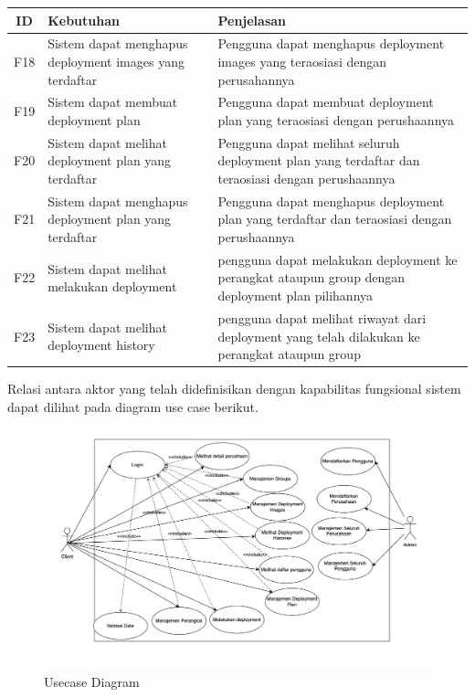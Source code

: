 \begin{table}
  \centering
  \begin{tabular}{|c|p{4.5cm}|p{8cm}|}
    \hline
    ID  & Kebutuhan                                               & Penjelasan                                                                                       \\
    \hline
    F18 & Sistem dapat menghapus deployment images yang terdaftar & Pengguna dapat menghapus deployment images yang teraosiasi dengan perusahannya                   \\
    \hline
    F19 & Sistem dapat membuat deployment plan                    & Pengguna dapat membuat deployment plan yang teraosiasi dengan perushaannya                       \\
    \hline
    F20 & Sistem dapat melihat deployment plan yang terdaftar     & Pengguna dapat melihat seluruh deployment plan yang terdaftar dan teraosiasi dengan perushaannya \\
    \hline
    F21 & Sistem dapat menghapus deployment plan yang terdaftar   & Pengguna dapat menghapus deployment plan yang terdaftar dan teraosiasi dengan perushaannya       \\
    \hline
    F22 & Sistem dapat melihat melakukan deployment               & pengguna dapat melakukan deployment ke perangkat ataupun group dengan deployment plan pilihannya \\
    \hline
    F23 & Sistem dapat melihat  deployment history                & pengguna dapat melihat riwayat dari deployment yang telah dilakukan ke perangkat ataupun group   \\
    \hline
  \end{tabular}
\end{table}

\pagebreak

Relasi antara aktor yang telah didefinisikan dengan kapabilitas fungsional sistem dapat dilihat pada diagram use case berikut.

\begin{figure}[h]
  \centering
  \includegraphics[width=1\textwidth]{resources/chapter-3/usecase-diagram.jpg}
  \caption{Usecase Diagram}
  \label{fig:usecase-diagram}
\end{figure}